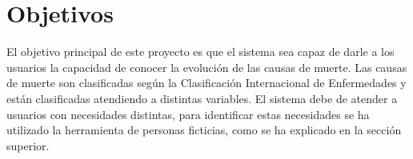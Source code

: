 \section{Objetivos}
El objetivo principal de este proyecto es que el sistema sea capaz de darle a los usuarios la capacidad de conocer
la evolución de las causas de muerte. Las causas de muerte son clasificadas según la Clasificación Internacional
de Enfermedades y están clasificadas atendiendo a distintas variables. El sistema debe de atender a usuarios con
necesidades distintas, para identificar estas necesidades se ha utilizado la herramienta de personas ficticias,
como se ha explicado en la sección superior.
